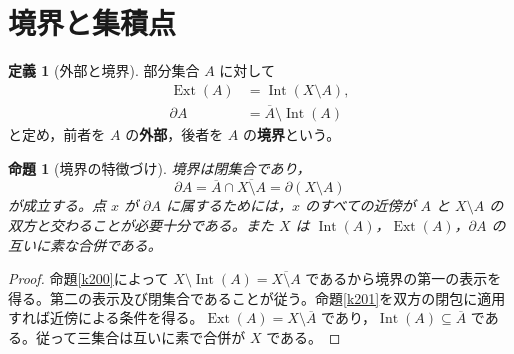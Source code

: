\documentclass[a5paper,10pt,dvipdfmx]{jsarticle}
\theoremstyle{definition}
\newtheorem{defn}[ruledef]{定義}
\theoremstyle{plain}
\newtheorem{prop}[ruledef]{命題}
\begin{document}
\section{境界と集積点}
\begin{defn}[外部と境界]\label{k203}
部分集合 $A$ に対して
\begin{align*}
 \operatorname{Ext}(A)&=\operatorname{Int}(X\setminus A),\\
 \partial A&=\overline A\setminus\operatorname{Int}(A)
\end{align*}
と定め，前者を $A$ の\textbf{外部}，後者を $A$ の\textbf{境界}という。
\end{defn}
\begin{prop}[境界の特徴づけ]\label{k204}
境界は閉集合であり，
\[
 \partial A=\overline A\cap\overline{X\setminus A}
             =\partial(X\setminus A)
\]
が成立する。点 $x$ が $\partial A$ に属するためには，$x$ のすべての近傍が $A$ と $X\setminus A$ の双方と交わることが必要十分である。また $X$ は $\operatorname{Int}(A)$，$\operatorname{Ext}(A)$，$\partial A$ の互いに素な合併である。
\end{prop}
\begin{proof}
命題\ref{k200}によって $X\setminus\operatorname{Int}(A)=\overline{X\setminus A}$ であるから境界の第一の表示を得る。第二の表示及び閉集合であることが従う。命題\ref{k201}を双方の閉包に適用すれば近傍による条件を得る。$\operatorname{Ext}(A)=X\setminus\overline A$ であり，$\operatorname{Int}(A)\subseteq\overline A$ である。従って三集合は互いに素で合併が $X$ である。
\end{proof}
\end{document}
